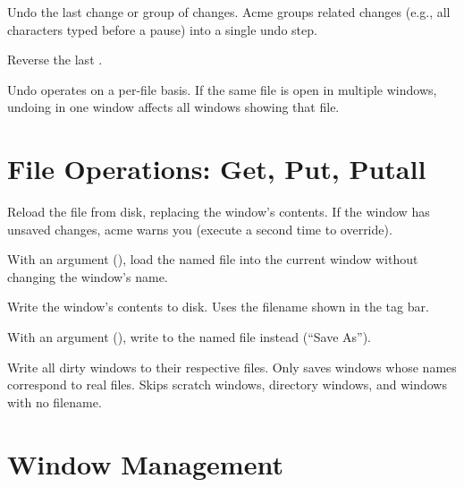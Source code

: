 \begin{description}[style=nextline]
\item[\cmd{Undo}]
Undo the last change or group of changes.  Acme groups related
changes (e.g., all characters typed before a pause) into a single
undo step.

\item[\cmd{Redo}]
Reverse the last .
\end{description}

Undo operates on a per-file basis.  If the same file is open in
multiple windows, undoing in one window affects all windows showing that
file.

\section{File Operations: Get, Put, Putall}
\label{sec:fileops}


\begin{description}[style=nextline]
\item[\cmd{Get}]
Reload the file from disk, replacing the window's contents.  If the
window has unsaved changes, acme warns you (execute  a
second time to override).

With an argument (), load the named file
into the current window without changing the window's name.

\item[\cmd{Put}]
Write the window's contents to disk.  Uses the filename shown in the
tag bar.

With an argument (), write to the named
file instead (``Save As'').

\item[\cmd{Putall}]
Write all dirty windows to their respective files.  Only saves
windows whose names correspond to real files.  Skips scratch
windows, directory windows, and windows with no filename.
\end{description}

\section{Window Management}
\label{sec:winmgmt}


